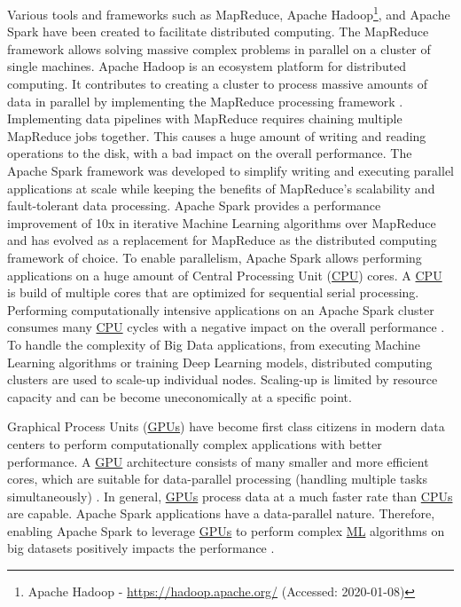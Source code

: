 Various tools and frameworks such as MapReduce\cite{Dean2004MapReduce}, Apache Hadoop\footnote{Apache Hadoop - \url{https://hadoop.apache.org/} (Accessed: 2020-01-08)}, and Apache Spark\cite{Zaharia2010Spark} have been created to facilitate distributed computing.
The MapReduce framework allows solving massive complex problems in parallel on a cluster of single machines.
Apache Hadoop is an ecosystem platform for distributed computing. It contributes to creating a cluster to process massive amounts of data in parallel by implementing the MapReduce processing framework \cite{Khattak2016BigData}.
Implementing data pipelines with MapReduce requires chaining multiple MapReduce jobs together. This causes a huge amount of writing and reading operations to the disk, with a bad impact on the overall performance. The Apache Spark framework was developed to simplify writing and executing parallel applications at scale while keeping the benefits of MapReduce's scalability and fault-tolerant data processing. Apache Spark provides a performance improvement of 10x in iterative Machine Learning algorithms over MapReduce \cite{Zaharia2010Spark} and has evolved as a replacement for MapReduce as the distributed computing framework of choice.
To enable parallelism, Apache Spark allows performing applications on a huge amount of Central Processing Unit (\hyperlink{abbr:cpu}{CPU}) cores. A \hyperlink{abbr:cpu}{CPU} is build of multiple cores that are optimized for sequential serial processing. Performing computationally intensive applications on an Apache Spark cluster consumes many \hyperlink{abbr:cpu}{CPU} cycles with a negative impact on the overall performance \cite{Li2015HeteroSpark}.
To handle the complexity of Big Data applications, from executing Machine Learning algorithms or training Deep Learning models, distributed computing clusters are used to scale-up individual nodes. Scaling-up is limited by resource capacity and can be become uneconomically at a specific point.


Graphical Process Units (\hyperlink{abbr:gpu}{GPUs}) have become first class citizens in modern data centers to perform computationally complex applications with better performance. A \hyperlink{abbr:gpu}{GPU} architecture consists of many smaller and more efficient cores, which are suitable for data-parallel processing (handling multiple tasks simultaneously) \cite{Yuan2016SparkGPU}. In general, \hyperlink{abbr:gpu}{GPUs} process data at a much faster rate than \hyperlink{abbr:cpu}{CPUs} are capable.
Apache Spark applications have a data-parallel nature. Therefore, enabling Apache Spark to leverage \hyperlink{abbr:gpu}{GPUs} to perform complex \hyperlink{abbr:ml}{ML} algorithms on big datasets positively impacts the performance \cite{Yuan2016SparkGPU}.


